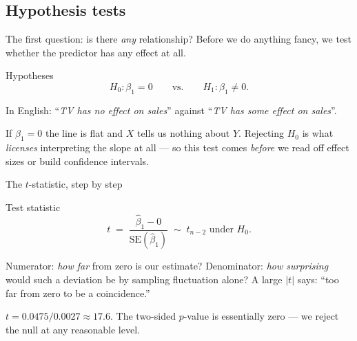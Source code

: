 \documentclass[aspectratio=169,11pt]{beamer}
\begin{document}
\subsection{Hypothesis tests}

\begin{frame}{The first question: is there \emph{any} relationship?}
  Before we do anything fancy, we test whether the predictor has any
  effect at all.
  \begin{block}{Hypotheses}
    \[
      H_0: \beta_1 = 0 \qquad \text{vs.} \qquad H_1: \beta_1 \ne 0.
    \]
  \end{block}
  In English: ``\emph{TV has no effect on sales}'' against
  ``\emph{TV has \emph{some} effect on sales}''.
  \begin{takeaway}
    If $\beta_1=0$ the line is flat and $X$ tells us nothing about $Y$.
    Rejecting $H_0$ is what \emph{licenses} interpreting the slope at all
    --- so this test comes \emph{before} we read off effect sizes or
    build confidence intervals.
  \end{takeaway}
\end{frame}

\begin{frame}{The $t$-statistic, step by step}
  \begin{block}{Test statistic}
    \[
      t \;=\; \frac{\hat\beta_1 - 0}{\mathrm{SE}(\hat\beta_1)}
            \;\sim\; t_{n-2} \text{ under } H_0.
    \]
  \end{block}
  \begin{readme}
    Numerator: \emph{how far} from zero is our estimate?
    Denominator: \emph{how surprising} would such a deviation be by
    sampling fluctuation alone?
    A large $|t|$ says: ``too far from zero to be a coincidence.''
  \end{readme}
  \begin{numexample}
    $t = 0.0475 / 0.0027 \approx 17.6$. The two-sided $p$-value is
    essentially zero --- we reject the null at any reasonable level.
  \end{numexample}
\end{frame}
\end{document}
